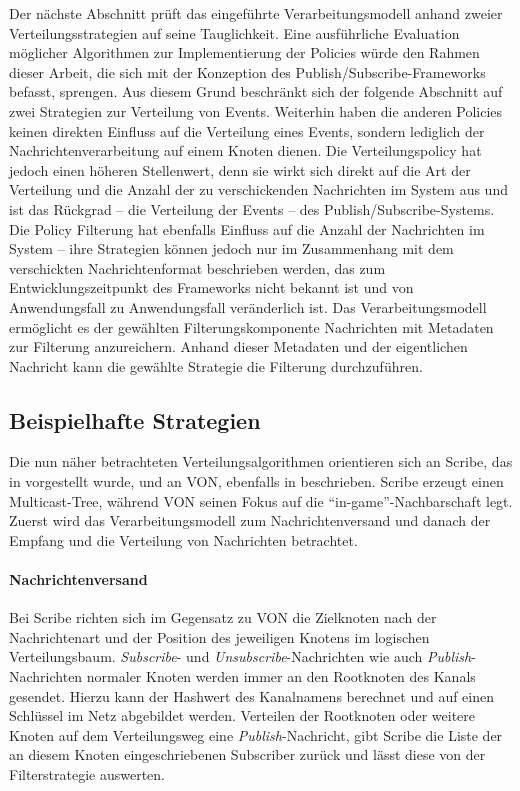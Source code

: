 Der nächste Abschnitt prüft das eingeführte Verarbeitungsmodell anhand zweier Verteilungsstrategien auf seine Tauglichkeit. Eine ausführliche Evaluation möglicher Algorithmen zur Implementierung der Policies würde den Rahmen dieser Arbeit, die sich mit der Konzeption des Publish/Subscribe-Frameworks befasst, sprengen. Aus diesem Grund beschränkt sich der folgende Abschnitt auf zwei Strategien zur Verteilung von Events. Weiterhin haben die anderen Policies keinen direkten Einfluss auf die Verteilung eines Events, sondern lediglich der Nachrichtenverarbeitung auf einem Knoten dienen. Die Verteilungspolicy hat jedoch einen höheren Stellenwert, denn sie wirkt sich direkt auf die Art der Verteilung und die Anzahl der zu verschickenden Nachrichten im System aus und ist das Rückgrad -- die Verteilung der Events -- des Publish/Subscribe-Systems. Die Policy Filterung hat ebenfalls Einfluss auf die Anzahl der Nachrichten im System -- ihre Strategien können jedoch nur im Zusammenhang mit dem verschickten Nachrichtenformat beschrieben werden, das zum Entwicklungszeitpunkt des Frameworks nicht bekannt ist und von Anwendungsfall zu Anwendungsfall veränderlich ist. Das Verarbeitungsmodell ermöglicht es der gewählten Filterungskomponente Nachrichten mit Metadaten zur Filterung anzureichern. Anhand dieser Metadaten und der eigentlichen Nachricht kann die gewählte Strategie die Filterung durchzuführen.

\subsection*{Beispielhafte Strategien}
Die nun näher betrachteten Verteilungsalgorithmen orientieren sich an Scribe, das in  vorgestellt wurde, und an VON, ebenfalls in  beschrieben. Scribe erzeugt einen Multicast-Tree, während VON seinen Fokus auf die \enquote{in-game}-Nachbarschaft legt. Zuerst wird das Verarbeitungsmodell zum Nachrichtenversand und danach der Empfang und die Verteilung von Nachrichten betrachtet.

\paragraph*{Nachrichtenversand}
Bei Scribe richten sich im Gegensatz zu VON die Zielknoten nach der Nachrichtenart und der Position des jeweiligen Knotens im logischen Verteilungsbaum. \emph{Subscribe}- und \emph{Unsubscribe}-Nachrichten wie auch \emph{Publish}-Nachrichten normaler Knoten werden immer an den Rootknoten des Kanals gesendet. Hierzu kann der Hashwert des Kanalnamens berechnet und auf einen Schlüssel im Netz abgebildet werden. Verteilen der Rootknoten oder weitere Knoten auf dem Verteilungsweg eine \emph{Publish}-Nachricht, gibt Scribe die Liste der an diesem Knoten eingeschriebenen Subscriber zurück und lässt diese von der Filterstrategie auswerten.

